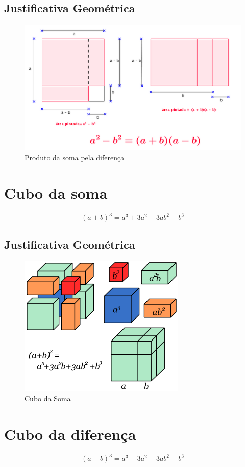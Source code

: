 \subsection{Justificativa Geométrica}
\begin{figure}[h]
    \centering
    \includegraphics[scale=.6]{./imagens/29.png}
    \caption{Produto da soma pela diferença}
    \label{fig:my_label}
\end{figure}

\section{Cubo da soma}

\begin{equation}
(a+b)^3=a^3+3a^2+3ab^2+b^3
\end{equation}

\subsection{Justificativa Geométrica}

\begin{figure}[h]
    \centering
    \includegraphics[scale=.5]{./imagens/13.png}
    \caption{Cubo da Soma}
    \label{fig:my_label}
\end{figure}

\section{Cubo da diferença}

\begin{equation}
(a-b)^3=a^3-3a^2+3ab^2-b^3
\end{equation}
